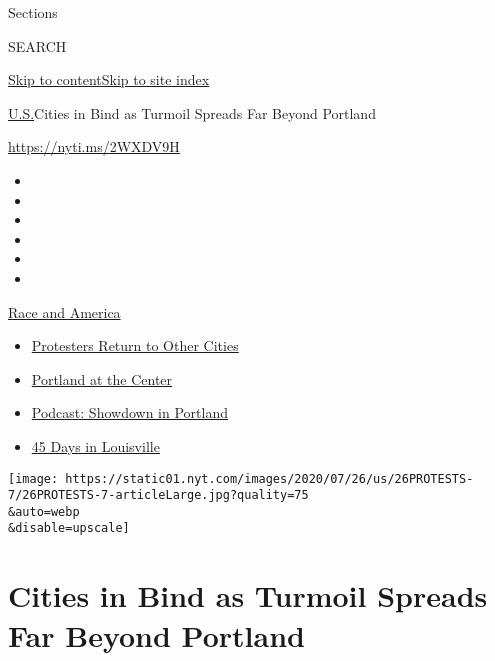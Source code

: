 Sections

SEARCH

\protect\hyperlink{site-content}{Skip to
content}\protect\hyperlink{site-index}{Skip to site index}

\href{/section/us}{U.S.}\textbar{}Cities in Bind as Turmoil Spreads Far
Beyond Portland

\url{https://nyti.ms/2WXDV9H}

\begin{itemize}
\item
\item
\item
\item
\item
\item
\end{itemize}

\href{https://www.nytimes.com/news-event/george-floyd-protests-minneapolis-new-york-los-angeles?action=click\&pgtype=Article\&state=default\&region=TOP_BANNER\&context=storylines_menu}{Race
and America}

\begin{itemize}
\tightlist
\item
  \href{https://www.nytimes.com/2020/07/26/us/protests-portland-seattle-trump.html?action=click\&pgtype=Article\&state=default\&region=TOP_BANNER\&context=storylines_menu}{Protesters
  Return to Other Cities}
\item
  \href{https://www.nytimes.com/2020/07/24/us/portland-oregon-protests-white-race.html?action=click\&pgtype=Article\&state=default\&region=TOP_BANNER\&context=storylines_menu}{Portland
  at the Center}
\item
  \href{https://www.nytimes.com/2020/07/23/podcasts/the-daily/portland-protests.html?action=click\&pgtype=Article\&state=default\&region=TOP_BANNER\&context=storylines_menu}{Podcast:
  Showdown in Portland}
\item
  \href{https://www.nytimes.com/interactive/2020/07/16/us/black-lives-matter-protests-louisville-breonna-taylor.html?action=click\&pgtype=Article\&state=default\&region=TOP_BANNER\&context=storylines_menu}{45
  Days in Louisville}
\end{itemize}

\texttt{[image: https://static01.nyt.com/images/2020/07/26/us/26PROTESTS-7/26PROTESTS-7-articleLarge.jpg?quality=75\\\&auto=webp\\\&disable=upscale]}

\hypertarget{cities-in-bind-as-turmoil-spreads-far-beyond-portland}{%
\section{Cities in Bind as Turmoil Spreads Far Beyond
Portland}\label{cities-in-bind-as-turmoil-spreads-far-beyond-portland}}

